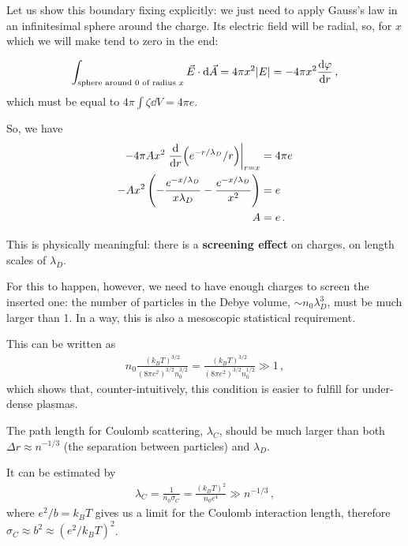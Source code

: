 \documentclass[main.tex]{subfiles}
\begin{document}
\begin{extracontent}
Let us show this boundary fixing explicitly: we just need to apply Gauss's law in an infinitesimal sphere around the charge. Its electric field will be radial, so, for \(x\) which we will make tend to zero in the end:

\begin{align}
\int _{\text{sphere around 0 of radius \(x\)}} \vec{E} \cdot \dd{\vec{A}} = 4 \pi x^2 \abs{E} = - 4 \pi x^2
\dv{\varphi}{r}
\,,
\end{align}
%
which must be equal to \(4 \pi \int \zeta \dd{V} = 4 \pi e\).

So, we have 
%
\begin{align}
- 4 \pi A x^2 \eval{\dv{r} (e^{-r/\lambda _D} / r)}_{r=x} &= 4 \pi e  \\
-A x^2\left( 
    -\frac{e^{-x / \lambda _D}}{x \lambda _D}
    - \frac{e^{-x / \lambda _D}}{x^2}
    \right)
    &= e  \\
    A &= e
\,.
\end{align}
%

\end{extracontent}

This is physically meaningful: there is a \textbf{screening effect} on charges, on length scales of \(\lambda _D\). 

For this to happen, however, we need to have enough charges to screen the inserted one: the number of particles in the Debye volume, \(\sim n_0 \lambda _D^3\), must be much larger than 1. 
In a way, this is also a mesoscopic statistical requirement. 

This can be written as 
%
\begin{align}
n_0 \frac{(k_BT)^{3/2}}{( 8 \pi e^2)^{3/2} n_0^{3/2}} 
= \frac{(k_BT)^{3/2}}{( 8 \pi e^2)^{3/2} n_0^{1/2}} 
\gg 1
\,,
\end{align}
%
which shows that, counter-intuitively, this condition is easier to fulfill for under-dense plasmas. 

The path length for Coulomb scattering, \(\lambda _C\), should be much larger than both \(\Delta r \approx n^{-1/3}\) (the separation between particles) and \(\lambda _D\). 

It can be estimated by 
%
\begin{align}
\lambda _C = \frac{1}{n_0 \sigma _C} = \frac{(k_B T)^2}{n_0 e^{4}} \gg n^{-1/3} 
\,,
\end{align}
%
where \(e^2 / b = k_B T\) gives us a limit for the Coulomb interaction length, therefore \(\sigma _C \approx b^2 \approx (e^2 / k_B T)^2\). 
\end{document}
